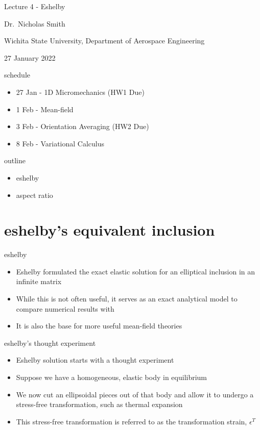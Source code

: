 \documentclass[
  letterpaper,
  ignorenonframetext,
  aspectratio=43,
  handout,
  12pt]{beamer}
\author{}
\date{}
\providecommand{\tightlist}{%
  \setlength{\itemsep}{0pt}\setlength{\parskip}{0pt}}
\providecommand{\tightlist}{%
\setlength{\itemsep}{0pt}\setlength{\parskip}{0pt}}
\begin{document}
\begin{frame}
Lecture 4 - Eshelby

Dr.~Nicholas Smith

Wichita State University, Department of Aerospace Engineering

27 January 2022
\end{frame}

\begin{frame}{schedule}
\protect\hypertarget{schedule}{}
\begin{itemize}
\tightlist
\item
  27 Jan - 1D Micromechanics (HW1 Due)
\item
  1 Feb - Mean-field
\item
  3 Feb - Orientation Averaging (HW2 Due)
\item
  8 Feb - Variational Calculus
\end{itemize}
\end{frame}

\begin{frame}{outline}
\protect\hypertarget{outline}{}
\begin{itemize}
\tightlist
\item
  eshelby
\item
  aspect ratio
\end{itemize}
\end{frame}

\hypertarget{eshelbys-equivalent-inclusion}{%
\section{eshelby's equivalent
inclusion}\label{eshelbys-equivalent-inclusion}}

\begin{frame}{eshelby}
\protect\hypertarget{eshelby}{}
\begin{itemize}
\tightlist
\item
  Eshelby formulated the exact elastic solution for an elliptical
  inclusion in an infinite matrix
\item
  While this is not often useful, it serves as an exact analytical model
  to compare numerical results with
\item
  It is also the base for more useful mean-field theories
\end{itemize}
\end{frame}

\begin{frame}{eshelby's thought experiment}
\protect\hypertarget{eshelbys-thought-experiment}{}
\begin{itemize}
\tightlist
\item
  Eshelby solution starts with a thought experiment
\item
  Suppose we have a homogeneous, elastic body in equilibrium
\item
  We now cut an ellipsoidal pieces out of that body and allow it to
  undergo a stress-free transformation, such as thermal expansion
\item
  This stress-free transformation is referred to as the transformation
  strain, \(\epsilon^T\)
\end{itemize}
\end{frame}
\end{document}
